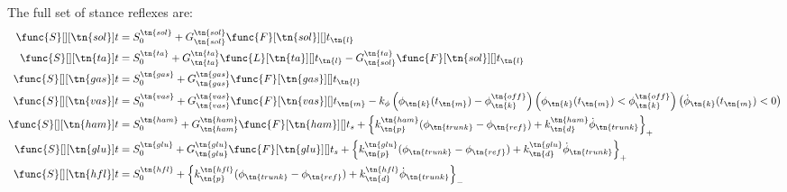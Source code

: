 \begin{fullwidth}
The full set of stance reflexes are:
\begin{align}    
    \func{S}[][\tn{sol}]{t} &= S_0^\tn{sol} + 
        G_\tn{sol}^\tn{sol} \func{F}[\tn{sol}][]{t_\tn{l}}
        \label{eq:sol_stim}\\
    \func{S}[][\tn{ta}]{t} &= S_0^\tn{ta} + 
        G_\tn{ta}^\tn{ta} \func{L}[\tn{ta}][]{t_\tn{l}} - G_\tn{sol}^\tn{ta} 
        \func{F}[\tn{sol}][]{t_\tn{l}} \label{eq:ta_stim}\\
    \func{S}[][\tn{gas}]{t} &= S_0^\tn{gas} + 
        G_\tn{gas}^\tn{gas} \func{F}[\tn{gas}][]{t_\tn{l}} 
        \label{eq:gas_stim_full}\\
    \func{S}[][\tn{vas}]{t} &= S_0^\tn{vas} + 
        G_\tn{vas}^\tn{vas} \func{F}[\tn{vas}][]{t_\tn{m}} 
        -k_\phi \left( \phi_\tn{k}(t_\tn{m}) - \phi_\tn{k}^\tn{off} \right) 
        \left( \phi_\tn{k}(t_\tn{m}) < \phi_\tn{k}^\tn{off} \right)
        \left( \dot \phi_\tn{k}(t_\tn{m}) < 0\right)    
        \label{eq:vas_stim_full}\\
    \func{S}[][\tn{ham}]{t} &= S_0^\tn{ham} + 
        G_\tn{ham}^\tn{ham} \func{F}[\tn{ham}][]{t_{s}} 
        + \left\{ k_\tn{p}^\tn{ham} (\phi_{\tn{trunk}} - \phi_{\tn{ref}}) 
        + k_\tn{d}^\tn{ham} \dot{\phi}_{\tn{trunk}} \right\}_+
        \label{eq:ham_stim_full} \\
    \func{S}[][\tn{glu}]{t} &= S_0^\tn{glu} + 
        G_\tn{glu}^\tn{glu} \func{F}[\tn{glu}][]{t_{s}}
        + \left\{ k_\tn{p}^\tn{glu} (\phi_{\tn{trunk}} - \phi_{\tn{ref}}) 
        + k_\tn{d}^\tn{glu} \dot{\phi}_{\tn{trunk}} \right\}_+  \\
    \func{S}[][\tn{hfl}]{t} &= S_0^\tn{hfl} + 
        \left\{ k_\tn{p}^\tn{hfl} (\phi_{\tn{trunk}} - \phi_{\tn{ref}}) 
        + k_\tn{d}^\tn{hfl} \dot{\phi}_{\tn{trunk}} \right\}_- 
\end{align}    
\end{fullwidth}
